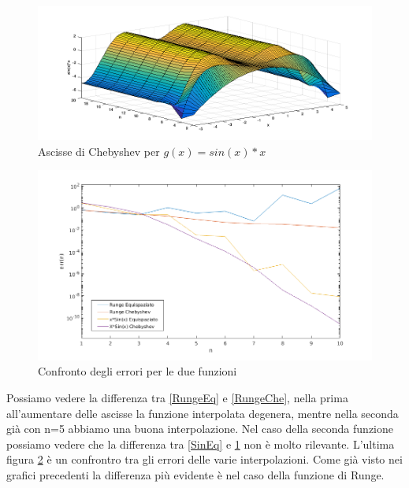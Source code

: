 \begin{figure}
\includegraphics[scale=0.7]{cap_4/es2/Sin_cheb.png}
\caption{Ascisse di Chebyshev per $g(x) = sin(x)*x$}
\label{SinChe}
\end{figure}
\begin{figure}
\includegraphics[scale=0.7]{cap_4/es2/error.png}
\caption{Confronto degli errori per le due funzioni}
\label{error}
\end{figure}
Possiamo vedere la differenza tra \ref{RungeEq} e \ref{RungeChe}, nella prima all'aumentare delle ascisse la funzione interpolata degenera, mentre nella seconda già con n=5 abbiamo una buona interpolazione.
Nel caso della seconda funzione possiamo vedere che la differenza tra \ref{SinEq} e \ref{SinChe} non è molto rilevante.
L'ultima figura \ref{error} è un confrontro tra gli errori delle varie interpolazioni. Come già visto nei grafici precedenti la differenza più evidente è nel caso della funzione di Runge.
